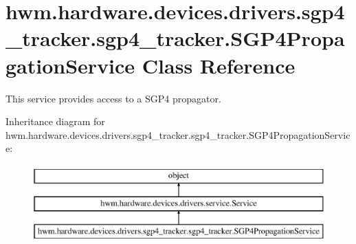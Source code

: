 \hypertarget{classhwm_1_1hardware_1_1devices_1_1drivers_1_1sgp4__tracker_1_1sgp4__tracker_1_1_s_g_p4_propagation_service}{\section{hwm.\-hardware.\-devices.\-drivers.\-sgp4\-\_\-tracker.\-sgp4\-\_\-tracker.\-S\-G\-P4\-Propagation\-Service Class Reference}
\label{classhwm_1_1hardware_1_1devices_1_1drivers_1_1sgp4__tracker_1_1sgp4__tracker_1_1_s_g_p4_propagation_service}
}


This service provides access to a S\-G\-P4 propagator.  


Inheritance diagram for hwm.\-hardware.\-devices.\-drivers.\-sgp4\-\_\-tracker.\-sgp4\-\_\-tracker.\-S\-G\-P4\-Propagation\-Service\-:\begin{figure}[H]
\begin{center}
\leavevmode
\includegraphics[height=3.000000cm]{classhwm_1_1hardware_1_1devices_1_1drivers_1_1sgp4__tracker_1_1sgp4__tracker_1_1_s_g_p4_propagation_service}
\end{center}
\end{figure}
